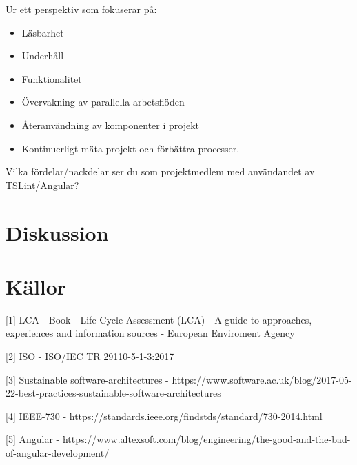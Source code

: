 Ur ett perspektiv som fokuserar på: 
\begin{itemize}
	\item Läsbarhet 
	\item Underhåll
	\item Funktionalitet
	\item Övervakning av parallella arbetsflöden
	\item Återanvändning av komponenter i projekt
	\item Kontinuerligt mäta projekt och förbättra processer.
\end{itemize}

Vilka fördelar/nackdelar ser du som projektmedlem med användandet av TSLint/Angular?


\section{Diskussion}


\section{Källor}

[1] LCA - Book - Life Cycle Assessment (LCA) - A guide to approaches, experiences and information sources - European Enviroment Agency 

[2] ISO - ISO/IEC TR 29110-5-1-3:2017 

[3] Sustainable software-architectures -  https://www.software.ac.uk/blog/2017-05-22-best-practices-sustainable-software-architectures 

[4] IEEE-730 - https://standards.ieee.org/findstds/standard/730-2014.html 

[5] Angular - https://www.altexsoft.com/blog/engineering/the-good-and-the-bad-of-angular-development/ 

